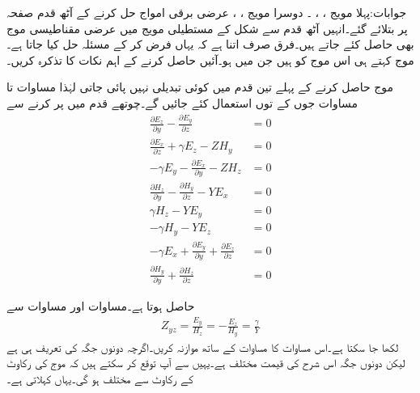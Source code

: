جوابات:پہلا مویج ، ، ۔ دوسرا مویج ، ، 
عرضی برقی امواج حل کرنے کے آٹھ قدم صفحہ  پر بتلائے گئے۔انہیں آٹھ قدم سے شکل  کے مستطیلی مویج میں  عرضی مقناطیسی موج  بھی حاصل کئے جاتے ہیں۔فرق صرف اتنا ہے کہ یہاں  فرض کر کے مسئلہ حل کیا جاتا ہے۔ موج کہتے ہی اس موج کو ہیں جن میں  ہو۔آئیں  حاصل کرنے کے اہم نکات کا تذکرہ کریں۔

موج حاصل کرنے کے پہلے تین قدم میں کوئی تبدیلی نہیں پائی جاتی لہٰذا مساوات  تا مساوات  جوں کے توں استعمال کئے جائیں گے۔چوتھے قدم میں  پر کرنے سے
\begin{align}
\frac{\partial E_z}{\partial y}-\frac{\partial E_y}{\partial z}&=0   \label{مساوات_مویج_عرضی_مقناطیسی_ب}\\
\frac{\partial E_x}{\partial z}+\gamma E_z-Z H_y&=0  \label{مساوات_مویج_عرضی_مقناطیسی_پ} \\
-\gamma E_y-\frac{\partial E_x}{\partial y}-Z H_z&=0 \label{مساوات_مویج_عرضی_مقناطیسی_ت}\\
\frac{\partial H_z}{\partial y}-\frac{\partial H_y}{\partial z}-YE_x&=0  \label{مساوات_مویج_عرضی_مقناطیسی_ٹ}\\
\gamma H_z-YE_y&=0  \label{مساوات_مویج_عرضی_مقناطیسی_ث}\\
-\gamma H_y-YE_z&=0 \label{مساوات_مویج_عرضی_مقناطیسی_ج}\\
-\gamma E_x+\frac{\partial E_y}{\partial y}+\frac{\partial E_z}{\partial z}&=0  \label{مساوات_مویج_عرضی_مقناطیسی_چ}\\
\frac{\partial H_y}{\partial y}+\frac{\partial H_z}{\partial z}&=0  \label{مساوات_مویج_عرضی_مقناطیسی_ح}
\end{align}

حاصل ہوتا ہے۔مساوات  اور مساوات  سے
\begin{align}\label{مساوات_مویج_عرضی_مقناطیسی_رکاوٹ}
Z_{yz}=\frac{E_y}{H_z}=-\frac{E_z}{H_y}=\frac{\gamma}{Y}
\end{align}
لکھا جا سکتا ہے۔اس مساوات کا مساوات  کے ساتھ موازنہ کریں۔اگرچہ دونوں جگہ   کی تعریف   ہی ہے لیکن دونوں جگہ اس شرح کی قیمت مختلف ہے۔یہیں سے آپ توقع کر سکتے ہیں کہ  موج کی رکاوٹ  کے رکاوٹ سے مختلف ہو گی۔یہاں   کہلاتی ہے۔


